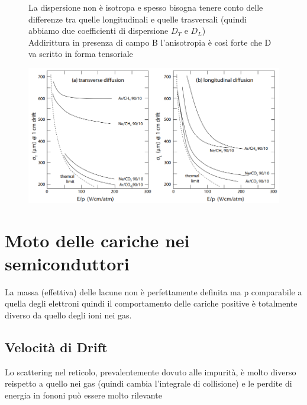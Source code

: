 \hspace{-25pt}
\begin{minipage}{0.35\textwidth}
    \begin{figure}[H]
        \centering
        \captionsetup{width=\textwidth}
        \caption{La dispersione non è isotropa e spesso bisogna tenere conto delle differenze tra quelle longitudinali e quelle trasversali (quindi abbiamo due coefficienti di dispersione $D_T$ e $D_L$)\\ Addirittura in presenza di campo B l'anisotropia è così forte che D va scritto in forma tensoriale}
    \end{figure}
\end{minipage} \hfill
\begin{minipage}{0.7\textwidth}

    \begin{figure}[H]
        \centering
        \includegraphics[width=\textwidth,frame]{Chapters/images/Interazione_radiazione_materia/image-20220222180339979.png}
        \captionsetup{width=\textwidth}
    \end{figure}
\end{minipage}

\newpage
\section{Moto delle cariche nei semiconduttori}
La massa (effettiva) delle lacune non è perfettamente definita ma p comparabile a quella degli elettroni quindi il comportamento delle cariche positive è totalmente diverso da quello degli ioni nei gas.

\subsection*{Velocità di Drift}
Lo scattering nel reticolo, prevalentemente dovuto alle impurità, è molto diverso reispetto a quello nei gas (quindi cambia l'integrale di collisione) e le perdite di energia in fononi  può essere molto rilevante

